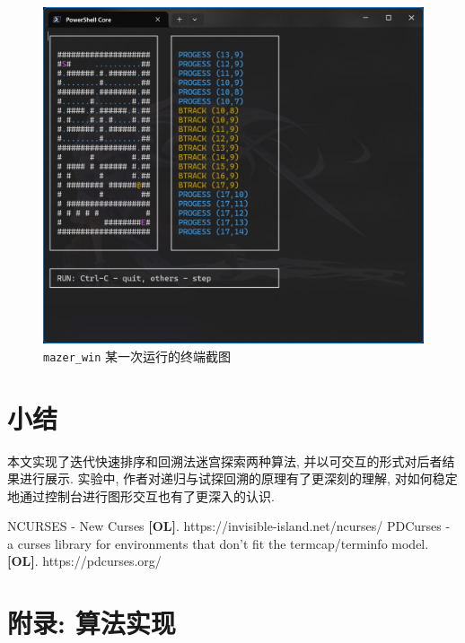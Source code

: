\documentclass[12pt]{article}
\begin{document}
\begin{figure}[H]
    \centering
    \includegraphics[scale=0.4]{screenshot_mazerwin_v010}
    \caption{\texttt{mazer\_win} 某一次运行的终端截图}
    \label{fig_screenshot_mazerwin}
\end{figure}

\section{小结}

本文实现了迭代快速排序和回溯法迷宫探索两种算法, 并以可交互的形式对后者结果进行展示.  实验中, 作者对递归与试探回溯的原理有了更深刻的理解, 对如何稳定地通过控制台进行图形交互也有了更深入的认识.

\begin{thebibliography}{}

 NCURSES - New Curses \textbf{[OL]}. https://invisible-island.net/ncurses/
 PDCurses - a curses library for environments that don't fit the termcap/terminfo model. \textbf{[OL]}. https://pdcurses.org/

\end{thebibliography}

\appendix

\section{附录: 算法实现}
\end{document}
